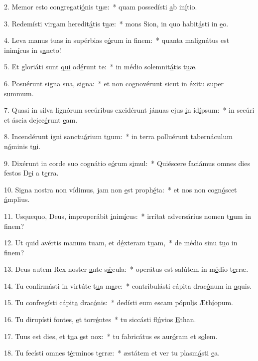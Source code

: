 2. Memor esto congregati\uline{ó}nis t\uline{u}æ:~* quam possedísti \uline{a}b in\uline{í}tio.\par 
3. Redemísti virgam heredit\uline{á}tis t\uline{u}æ:~* mons Sion, in quo habit\uline{á}sti in \uline{e}o.\par 
4. Leva manus tuas in supérbias e\uline{ó}rum in f\uline{i}nem:~* quanta malignátus est inim\uline{í}cus in s\uline{a}ncto!\par 
5. Et gloriáti sunt \uline{qui} od\uline{é}runt te:~* in médio solemnit\uline{á}tis t\uline{u}æ.\par 
6. Posuérunt signa s\uline{u}a, s\uline{i}gna:~* et non cognovérunt sicut in éxitu s\uline{u}per s\uline{u}mmum.\par 
7. Quasi in silva lignórum secúribus excidérunt jánuas ejus \uline{i}n id\uline{í}psum:~* in secúri et áscia dejec\uline{é}runt \uline{e}am.\par 
8. Incendérunt igni sanctu\uline{á}rium t\uline{u}um:~* in terra polluérunt tabernáculum n\uline{ó}minis t\uline{u}i.\par 
9. Dixérunt in corde suo cognátio e\uline{ó}rum s\uline{i}mul:~* Quiéscere faciámus omnes dies festos D\uline{e}i a t\uline{e}rra.\par 
10. Signa nostra non vídimus, jam non \uline{e}st proph\uline{é}ta:~* et nos non cogn\uline{ó}scet \uline{á}mplius.\par 
11. Usquequo, Deus, improperábit \uline{i}nim\uline{í}cus:~* irrítat adversárius nomen t\uline{u}um in f\uline{i}nem?\par 
12. Ut quid avértis manum tuam, et d\uline{é}xteram t\uline{u}am,~* de médio sinu t\uline{u}o in f\uline{i}nem?\par 
13. Deus autem Rex noster \uline{a}nte s\uline{ǽ}cula:~* operátus est salútem in m\uline{é}dio t\uline{e}rræ.\par 
14. Tu confirmásti in virtúte t\uline{u}a m\uline{a}re:~* contribulásti cápita drac\uline{ó}num in \uline{a}quis.\par 
15. Tu confregísti cápit\uline{a} drac\uline{ó}nis:~* dedísti eum escam pópul\uline{i}s Æth\uline{í}opum.\par 
16. Tu dirupísti fontes, \uline{e}t torr\uline{é}ntes~* tu siccásti fl\uline{ú}vios \uline{E}than.\par 
17. Tuus est dies, et t\uline{u}a \uline{e}st nox:~* tu fabricátus es aur\uline{ó}ram et s\uline{o}lem.\par 
18. Tu fecísti omnes t\uline{é}rminos t\uline{e}rræ:~* æstátem et ver tu plasm\uline{á}sti \uline{e}a.\par 
